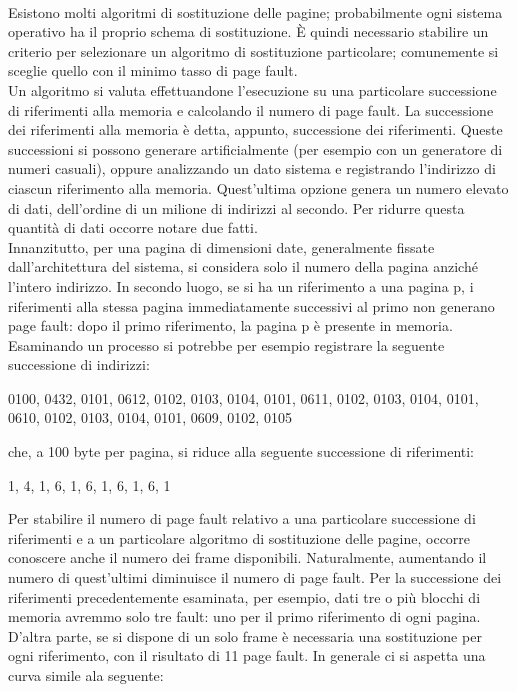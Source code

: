 \documentclass{article}
\begin{document}
				\\Esistono molti algoritmi di sostituzione delle pagine; probabilmente ogni sistema operativo ha il proprio schema di sostituzione. È quindi necessario stabilire un criterio per selezionare un algoritmo di sostituzione particolare; comunemente si sceglie quello con il minimo tasso di page fault.
				\\Un algoritmo si valuta effettuandone l’esecuzione su una particolare successione di riferimenti alla memoria e calcolando il numero di page fault. La successione dei riferimenti alla memoria è detta, appunto, successione dei riferimenti. Queste successioni si possono generare artificialmente (per esempio con un generatore di numeri casuali), oppure analizzando un dato sistema e registrando l’indirizzo di ciascun riferimento alla memoria. Quest’ultima opzione genera un numero elevato di dati, dell’ordine di un milione di indirizzi al secondo. Per ridurre questa quantità di dati occorre notare due fatti.
				\\Innanzitutto, per una pagina di dimensioni date, generalmente fissate dall’architettura del sistema, si considera solo il numero della pagina anziché l’intero indirizzo. In secondo luogo, se si ha un riferimento a una pagina p, i riferimenti alla stessa pagina immediatamente successivi al primo non generano page fault: dopo il primo riferimento, la pagina p è presente in memoria.
				\\Esaminando un processo si potrebbe per esempio registrare la seguente successione di indirizzi:
				\begin{center}
					0100, 0432, 0101, 0612, 0102, 0103, 0104, 0101, 0611, 0102, 0103,
					0104, 0101, 0610, 0102, 0103, 0104, 0101, 0609, 0102, 0105
				\end{center}
				che, a 100 byte per pagina, si riduce alla seguente successione di riferimenti:
				\begin{center}
					1, 4, 1, 6, 1, 6, 1, 6, 1, 6, 1
				\end{center}
				Per stabilire il numero di page fault relativo a una particolare successione di riferimenti e a un particolare algoritmo di sostituzione delle pagine, occorre conoscere anche il numero dei frame disponibili. Naturalmente, aumentando il numero di quest’ultimi diminuisce il numero di page fault. Per la successione dei riferimenti precedentemente esaminata, per esempio, dati tre o più blocchi di memoria avremmo solo tre fault: uno per il primo riferimento di ogni pagina. D’altra parte, se si dispone di un solo frame è necessaria una sostituzione per ogni riferimento, con il risultato di 11 page fault. In generale ci si aspetta una curva simile ala seguente:
\end{document}

